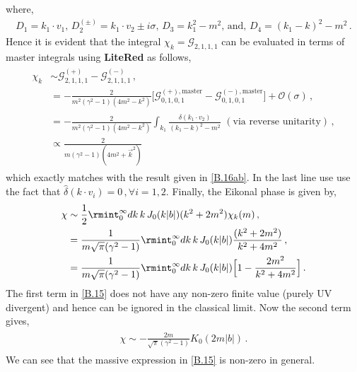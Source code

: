   where,
  \begin{align}
      D_1=k_1\cdot v_1,\,D_2^{(\pm)}=k_1\cdot v_2\pm i\sigma,\,D_3=k_1^2-m^2, \,\textrm{and},\,D_4=(k_1-k)^2-m^2\,.
  \end{align}
  Hence it is evident that  the integral $\chi_k= \mathcal{G}_{2,1,1,1}$ can be evaluated  in terms of master integrals using \textbf{LiteRed} \cite{Lee:2012cn} as follows,
  \begin{align}
  \begin{split}
    \chi_k&\sim  \mathcal{G}^{(+)}_{2,1,1,1}- \mathcal{G}^{(-)}_{2,1,1,1}\,,\\ &
    =-\frac{2}{m^2(\gamma^2-1)(4m^2-k^2)}\Big[\mathcal{G}_{0,1,0,1}^{(+),\textrm{master}}-\mathcal{G}_{0,1,0,1}^{(-),\textrm{master}}\Big]+\mathcal{O}(\sigma)\,,\\ &
    =-\frac{2}{m^2(\gamma^2-1)(4m^2-k^2)}\int_{k_1}\frac{\hat\delta(k_1\cdot v_2)}{(k_1-k)^2-m^2}\,\,(\textrm{via reverse unitarity})\,,\\ &
    \propto \frac{2}{m(\gamma^2-1)(4m^2+\vec k^2)}
    \end{split}
  \end{align}
  which exactly matches with the result given in \eqref{B.16ab}. In the last line use use the fact that $\hat\delta(k\cdot v_i)=0\,,\forall i=1,2$. Finally, the Eikonal phase is given by,
     \begin{align}
         \begin{split}
             \chi&\sim\frac{1}{2} \rmint_0^\infty dk\,k\, J_{0}(k|b|)(k^2+2m^2)\chi_k(m)\,,\\ &
             =\frac{1}{m\sqrt{\pi}(\gamma^2-1)}\rmint_0^\infty dk\, k\,J_{0}(k|b|)\frac{(k^2+2m^2)}{k^2+4m^2}\,,\\ &
             =\frac{1}{m\sqrt{\pi}(\gamma^2-1)}\rmint_0^\infty dk\, k\,J_{0}(k|b|)\Big[1-\frac{2m^2}{k^2+4m^2}\Big]\,.\label{B.15}
         \end{split}
     \end{align}
     The first term in \eqref{B.15} does not have any non-zero finite value (purely UV divergent) and hence can be ignored in the classical limit. Now the second term gives,
     \begin{align}
         \begin{split}
             \chi\sim -\frac{2 m}{\sqrt{\pi}(\gamma^2-1)}K_{0}(2 m|b|)\,.
         \end{split}
     \end{align}
We can see that the massive expression in \eqref{B.15} is non-zero in general.
